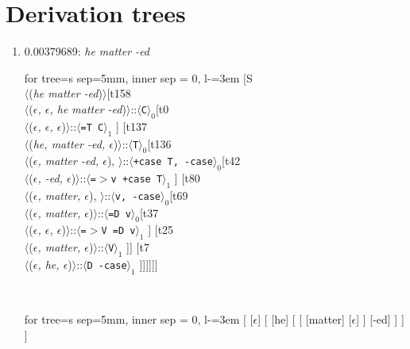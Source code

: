 \documentclass[11pt]{article}
\begin{document}
\section{Derivation trees}
\begin{enumerate}
	\item  0.00379689: \textit{he matter -ed} \\[0.5em]
	\begin{adjustbox}{max width = \textwidth}
	\begin{forest}
	for tree={s sep=5mm, inner sep = 0, l-=3em}
	[S\\$\langle$(\textit{he matter -ed})$\rangle$[t158\\$\langle$(\textit{$\epsilon${,} $\epsilon${,} he matter -ed})$\rangle$::$\langle$\texttt{C}$\rangle_0$[t0\\$\langle$(\textit{$\epsilon${,} $\epsilon${,} $\epsilon$})$\rangle$::$\langle$\texttt{{=}T C}$\rangle_1$ ] [t137\\$\langle$(\textit{he{,} matter -ed{,} $\epsilon$})$\rangle$::$\langle$\texttt{T}$\rangle_0$[t136\\$\langle$(\textit{$\epsilon${,} matter -ed{,} $\epsilon$}){,} $\rangle$::$\langle$\texttt{+case T{,} -case}$\rangle_0$[t42\\$\langle$(\textit{$\epsilon${,} -ed{,} $\epsilon$})$\rangle$::$\langle$\texttt{{=}$>$v +case T}$\rangle_1$ ] [t80\\$\langle$(\textit{$\epsilon${,} matter{,} $\epsilon$}){,} $\rangle$::$\langle$\texttt{v{,} -case}$\rangle_0$[t69\\$\langle$(\textit{$\epsilon${,} matter{,} $\epsilon$})$\rangle$::$\langle$\texttt{{=}D v}$\rangle_0$[t37\\$\langle$(\textit{$\epsilon${,} $\epsilon${,} $\epsilon$})$\rangle$::$\langle$\texttt{{=}$>$V {=}D v}$\rangle_1$ ] [t25\\$\langle$(\textit{$\epsilon${,} matter{,} $\epsilon$})$\rangle$::$\langle$\texttt{V}$\rangle_1$ ]] [t7\\$\langle$(\textit{$\epsilon${,} he{,} $\epsilon$})$\rangle$::$\langle$\texttt{D -case}$\rangle_1$ ]]]]]]
	\end{forest}
	\end{adjustbox}
	\\
	\begin{adjustbox}{max width = \textwidth}
	\begin{forest}
	for tree={s sep=5mm, inner sep = 0, l-=3em}
	[ [$\epsilon$] [ [he] [ [ [matter] [$\epsilon$] ] [-ed] ] ] ]
	\end{forest}
	\end{adjustbox}
	\newpage


\end{enumerate}
\end{document}
